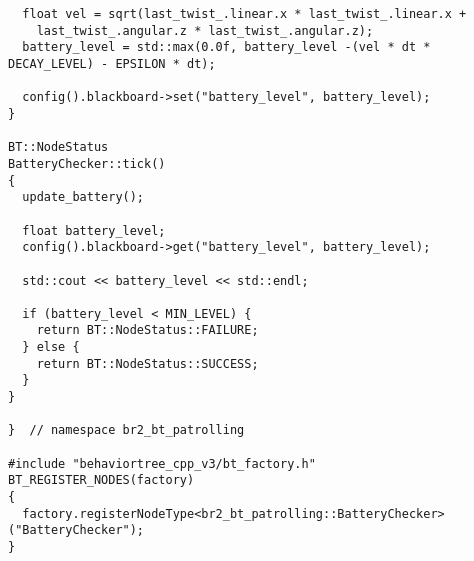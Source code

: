 \begin{tcolorbox}[sharp corners, colframe=gray!80, colback=LightGray, left=0pt, top=0pt, bottom=0pt, title=\texttt{br2\_bt\_patrolling/src/br2\_bt\_patrolling/BatteryChecker.cpp}]
\begin{verbatim}
  float vel = sqrt(last_twist_.linear.x * last_twist_.linear.x +
    last_twist_.angular.z * last_twist_.angular.z);
  battery_level = std::max(0.0f, battery_level -(vel * dt * DECAY_LEVEL) - EPSILON * dt);

  config().blackboard->set("battery_level", battery_level);
}

BT::NodeStatus
BatteryChecker::tick()
{
  update_battery();

  float battery_level;
  config().blackboard->get("battery_level", battery_level);

  std::cout << battery_level << std::endl;

  if (battery_level < MIN_LEVEL) {
    return BT::NodeStatus::FAILURE;
  } else {
    return BT::NodeStatus::SUCCESS;
  }
}

}  // namespace br2_bt_patrolling

#include "behaviortree_cpp_v3/bt_factory.h"
BT_REGISTER_NODES(factory)
{
  factory.registerNodeType<br2_bt_patrolling::BatteryChecker>("BatteryChecker");
}
    \end{verbatim}
    \end{tcolorbox}
  \normalsize

